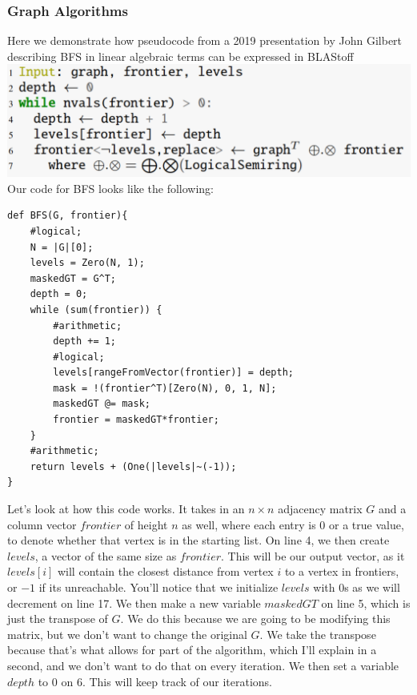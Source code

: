\subsubsection{Graph Algorithms}
Here we demonstrate how pseudocode from a 2019 presentation by John Gilbert describing BFS in linear algebraic terms \cite{Gilbert} can be expressed in BLAStoff\\
\includegraphics[scale=0.4]{figures/pseudocode}\\
Our code for BFS looks like the following:
\begin{lstlisting}
def BFS(G, frontier){
    #logical;
    N = |G|[0];
    levels = Zero(N, 1);
    maskedGT = G^T;
    depth = 0;
    while (sum(frontier)) {
        #arithmetic;
        depth += 1;
        #logical;
        levels[rangeFromVector(frontier)] = depth;
        mask = !(frontier^T)[Zero(N), 0, 1, N];
        maskedGT @= mask;
        frontier = maskedGT*frontier;
    }
    #arithmetic;
    return levels + (One(|levels|~(-1));
}
\end{lstlisting}
Let's look at how this code works.  It takes in an $n\times n$ adjacency matrix $G$ and a column vector $frontier$ of height $n$ as well, where each entry is 0 or a true value, to denote whether that vertex is in the starting list.  On line 4, we then create $levels$, a vector of the same size as $frontier$.  This will be our output vector, as it $levels[i]$ will contain the closest distance from vertex $i$ to a vertex in frontiers, or $-1$ if its unreachable.   You'll notice that we initialize $levels$ with 0s as we will decrement on line 17.  We then make a new variable $maskedGT$ on line 5, which is just the transpose of $G$.  We do this because we are going to be modifying this matrix, but we don't want to change the original $G$.  We take the transpose because that's what allows for part of the algorithm, which I'll explain in a second, and we don't want to do that on every iteration. We then set a variable $depth$ to 0 on 6.  This will keep track of our iterations.

